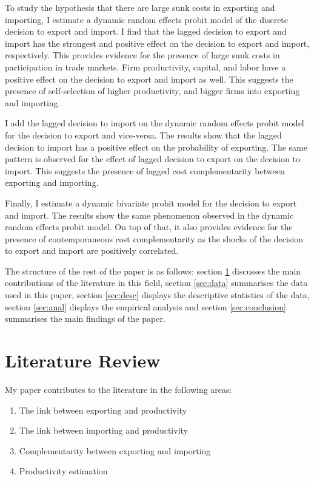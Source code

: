 \documentclass[12pt]{article}
\begin{document}
To study the hypothesis that there are large sunk costs in exporting
and importing, I estimate a dynamic random effects probit model of the discrete
decision to export and import. I find that the lagged decision to
export and import has the
 strongest and positive effect on the decision to export and
import, respectively.  This provides evidence for the presence of
large sunk costs in participation in trade markets. Firm productivity,
capital, and labor have a positive
effect on the decision to export and import as well. This suggests the
presence of self-selection of higher productivity, and bigger firms into exporting
and importing. 

I add the lagged decision to import on the dynamic random effects
probit model for the decision to export and vice-versa. The results show that the lagged
decision to import has a positive effect on the probability of
exporting. The same pattern is observed for the effect of lagged
decision to export on the decision to import. This suggests the
presence of lagged cost complementarity between exporting and
importing. 

Finally, I estimate a dynamic bivariate probit model for the decision to export
and import. The results show the same phenomenon observed in the
dynamic random effects probit model. On top of that, it also provides
evidence for the presence
of contemporaneous cost complementarity as the shocks of the decision
to export and import are positively correlated. 


The structure of the rest of the paper is as follows: section \ref{sec:lit} discusses
the main contributions of the literature in this field, section
\ref{sec:data} summarises the data used in this paper, section
\ref{sec:desc} displays the descriptive statistics of the data,
section \ref{sec:anal} displays the empirical analysis and section 
\ref{sec:conclusion} summarises the main findings of the paper. 


\section{Literature Review}\label{sec:lit}
My paper contributes to the literature in the following areas: 
\begin{enumerate}
\item The link between exporting and productivity
\item The link between importing and productivity 
\item Complementarity between exporting and importing
\item Productivity estimation
\end{enumerate}
\end{document}
